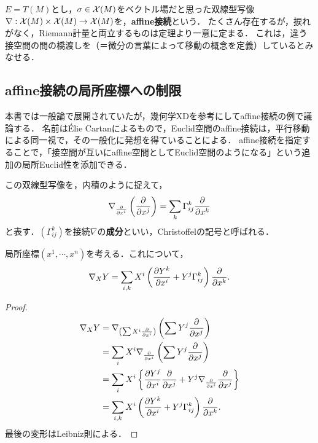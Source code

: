 \documentclass[uplatex,dvipdfmx]{jsreport}
\begin{document}
\begin{example}
    $E=T(M)$とし，$\sigma\in\mathcal{X}(M)$をベクトル場だと思った双線型写像$\nabla:\mathcal{X}(M)\times\mathcal{X}(M)\to\mathcal{X}(M)$を，\textbf{affine接続}という．
    たくさん存在するが，捩れがなく，Riemann計量と両立するものは定理より一意に定まる．
    これは，違う接空間の間の橋渡しを（＝微分の言葉によって移動の概念を定義）しているとみなせる．
\end{example}

\subsection{affine接続の局所座標への制限}

\begin{tcolorbox}[colframe=ForestGreen, colback=ForestGreen!10!white,breakable,colbacktitle=ForestGreen!40!white,coltitle=black,fonttitle=\bfseries\sffamily,
title=affine接続＝共変微分とは「ベクトル場のベクトル場に沿った方向微分」]
    本書では一般論で展開されていたが，幾何学XDを参考にしてaffine接続の例で議論する．
    名前はÉlie Cartanによるもので，Euclid空間のaffine接続は，平行移動による同一視で，その一般化に発想を得ていることによる．
    affine接続を指定することで，「接空間が互いにaffine空間としてEuclid空間のようになる」という追加の局所Euclid性を添加できる．
\end{tcolorbox}

\begin{definition}
    この双線型写像を，内積のように捉えて，
    \[\nabla_{\frac{\partial }{\partial x^i}}\left(\frac{\partial }{\partial x^j}\right)=\sum_{k}\Gamma^k_{ij}\frac{\partial }{\partial x^k}\]
    と表す．$(\Gamma^k_{ij})$を接続$\nabla$の\textbf{成分}といい，Christoffelの記号と呼ばれる．
\end{definition}

\begin{theorem}
    局所座標$(x^1,\cdots,x^n)$を考える．これについて，
    \[\nabla_XY=\sum_{i,k}X^i\left(\frac{\partial Y^k}{\partial x^i}+Y^j\Gamma^k_{ij}\right)\frac{\partial }{\partial x^k}.\]
\end{theorem}
\begin{proof}
    \begin{align*}
        \nabla_XY&=\nabla_{\left(\sum X^i\frac{\partial }{\partial x^i}\right)}\left(\sum Y^j\frac{\partial }{\partial x^j}\right)\\
        &=\sum_iX^i\nabla_{\frac{\partial }{\partial x^i}}\left(\sum Y^j\frac{\partial }{\partial x^j}\right)\\
        &=\sum_iX^i\left\{\frac{\partial Y^j}{\partial x^i}\frac{\partial }{\partial x^j}+Y^j\nabla_{\frac{\partial }{\partial x^i}}\frac{\partial }{\partial x^j}\right\}\\
        &=\sum_{i,k}X^i\left(\frac{\partial Y^k}{\partial x^i}+Y^j\Gamma^k_{ij}\right)\frac{\partial }{\partial x^k}.
    \end{align*}
    最後の変形はLeibniz則による．
\end{proof}
\end{document}
